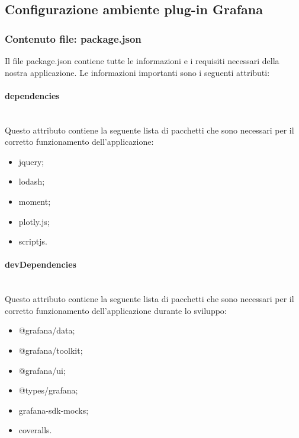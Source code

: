 \subsection{Configurazione ambiente plug-in Grafana}
\subsubsection{Contenuto file: package.json}
Il file package.json contiene tutte le informazioni e i requisiti necessari della nostra applicazione. Le informazioni importanti sono i seguenti attributi:
\paragraph{dependencies}\mbox{}\\ [1mm]
Questo attributo contiene la seguente lista di pacchetti che sono necessari per il corretto funzionamento dell'applicazione:
\begin{itemize}
	\item jquery;
	\item lodash;
	\item moment;
	\item plotly.js;
	\item scriptjs.
\end{itemize}
\paragraph{devDependencies}\mbox{}\\ [1mm]
Questo attributo contiene la seguente lista di pacchetti che sono necessari per il corretto funzionamento dell'applicazione durante lo sviluppo:
\begin{itemize}
	\item @grafana/data;
	\item @grafana/toolkit;
	\item @grafana/ui;
	\item @types/grafana;
	\item grafana-sdk-mocks;
	\item coveralls.
\end{itemize}
